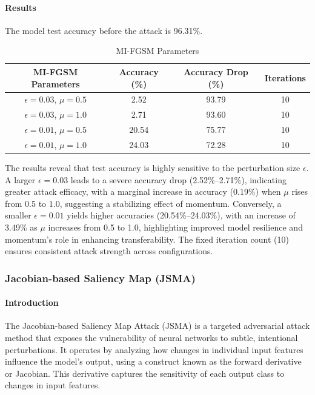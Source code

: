 \documentclass[../main.tex]{subfiles}
\begin{document}
\paragraph{Results}

The model test accuracy before the attack is 96.31\%.

\begin{table}[h]
\centering
\caption{MI-FGSM Parameters}
\begin{tabular}{cccc}
\toprule
\textbf{MI-FGSM Parameters} & \textbf{Accuracy (\%)} & \textbf{Accuracy Drop (\%)} & \textbf{Iterations} \\
\midrule
$\epsilon = 0.03$, $\mu = 0.5$ & 2.52 & 93.79 & 10 \\
$\epsilon = 0.03$, $\mu = 1.0$ & 2.71 & 93.60 & 10 \\
$\epsilon = 0.01$, $\mu = 0.5$ & 20.54 & 75.77 & 10 \\
$\epsilon = 0.01$, $\mu = 1.0$ & 24.03 & 72.28 & 10 \\
\bottomrule
\end{tabular}
\end{table}

The results reveal that test accuracy is highly sensitive to the perturbation size $\epsilon$. A larger $\epsilon = 0.03$ leads to a severe accuracy drop (2.52\%–2.71\%), indicating greater attack efficacy, with a marginal increase in accuracy (0.19\%) when $\mu$ rises from 0.5 to 1.0, suggesting a stabilizing effect of momentum. Conversely, a smaller $\epsilon = 0.01$ yields higher accuracies (20.54\%–24.03\%), with an increase of 3.49\% as $\mu$ increases from 0.5 to 1.0, highlighting improved model resilience and momentum’s role in enhancing transferability. The fixed iteration count (10) ensures consistent attack strength across configurations.
\clearpage

\subsubsection{Jacobian-based Saliency Map (JSMA) }
\paragraph{Introduction} 
The Jacobian-based Saliency Map Attack (JSMA) is a targeted adversarial attack method that exposes the vulnerability of neural networks to subtle, intentional perturbations. It operates by analyzing how changes in individual input features influence the model's output, using a construct known as the forward derivative or Jacobian. This derivative captures the sensitivity of each output class to changes in input features.
\end{document}
